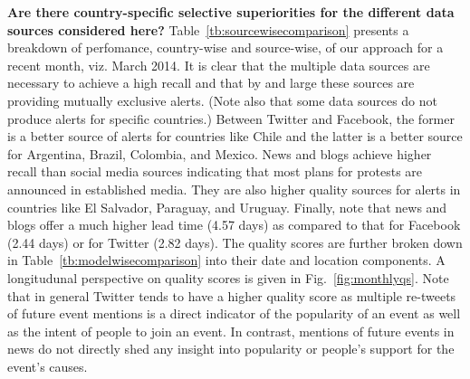 \documentclass[letterpaper]{article}
\begin{document}
\vspace{-1em}
\noindent
{\bf Are there country-specific selective superiorities for the different data sources considered here?}
Table~\ref{tb:sourcewisecomparison} presents a breakdown of perfomance, country-wise and source-wise, of 
our approach for a recent month, viz. March 2014.
It is clear that the multiple data sources are necessary to achieve a high recall and that by and large
these sources are providing mutually exclusive alerts. (Note also that some data sources do not produce alerts for specific
countries.) Between Twitter and Facebook, the former is a better
source of alerts for countries like Chile and the latter is a better source for Argentina, Brazil, Colombia, and Mexico.
News and blogs achieve higher recall than social media sources indicating that most plans for protests are announced
in established media. They are also
higher quality sources for alerts in countries like El Salvador, Paraguay, and Uruguay.
Finally, note that news and blogs offer a much higher lead time (4.57 days) 
as compared to that for Facebook (2.44 days) or for Twitter (2.82 days). The quality scores are
further broken down in Table~\ref{tb:modelwisecomparison} into their date and location components.
A longitudunal perspective on quality scores is
given in Fig.~\ref{fig:monthlyqs}. Note that in general Twitter tends to have a higher quality score
as multiple re-tweets of future event mentions is a direct indicator of the popularity of an event as 
well as the intent of people to join an event. 
In contrast, mentions of future events in news do not directly shed any insight into popularity or people's
support for the event's causes.\\
\end{document}
